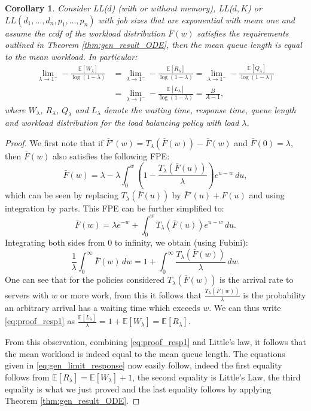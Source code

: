 \documentclass[12pt]{report}
\newcommand{\E}{\mathbb{E}}
\newtheorem{corollary}[theorem]{Corollary}
\begin{document}
\begin{corollary}\label{cor:gen_result}
Consider LL($d$) (with or without memory), LL($d,K$) or $LL(d_1,\ldots,d_n,p_1,\ldots,p_n)$ with
job sizes that are exponential with mean one and assume 
the ccdf of the workload distribution $\bar F(w)$ satisfies the requirements outlined in Theorem \ref{thm:gen_result_ODE}, then the mean queue length is equal to the mean workload. In particular:
\begin{align}
\lim_{\lambda\rightarrow 1^-} - \frac{\E[W_\lambda]}{\log(1-\lambda)} 
&= \lim_{\lambda\rightarrow 1^-} - \frac{\E[R_\lambda]}{\log(1-\lambda)} 
= \lim_{\lambda\rightarrow 1^-} - \frac{\E[Q_\lambda]}{\log(1-\lambda)} \nonumber\\
&= \lim_{\lambda\rightarrow 1^-} - \frac{\E[L_\lambda]}{\log(1-\lambda)}
= \frac{B}{A-1},\label{eq:gen_limit_response}
\end{align}
where $W_\lambda$, $R_\lambda$, $Q_\lambda$ and $L_\lambda$ denote the waiting time, response time, queue length and workload distribution for the load balancing policy with load $\lambda$.
\end{corollary}
\begin{proof}
We first note that if $\bar F'(w) = T_\lambda(\bar{F}(w)) - \bar F(w)$
and $\bar F(0) = \lambda$, then $\bar F(w)$ also satisfies the following FPE:
$$
\bar F(w) = \lambda - \lambda \int_0^w \left( 1 - \frac{T_\lambda(\bar F(u))}{\lambda} \right) e^{u-w} \, du,
$$
which can be seen by replacing $T_\lambda(\bar F(u))$ by $\bar F'(u)+F(u)$ and using integration
by parts. This FPE can be further simplified to:
$$
\bar F(w) = \lambda e^{-w} + \int_0^w T_\lambda(\bar F(u)) e^{u-w} \, du.
$$
Integrating both sides from $0$ to infinity, we obtain (using Fubini):
\begin{equation} \label{eq:proof_resp1}
\frac{1}{\lambda} \int_0^\infty \bar F(w) \, dw = 1 + \int_0^\infty \frac{T_\lambda(\bar F(w))}{\lambda} \, dw.
\end{equation}
One can see that for the policies considered $T_\lambda(\bar F(w))$ is the arrival rate to servers with $w$ or more work, from this it follows that $\frac{T_\lambda(\bar F(w))}{\lambda}$ is the probability an arbitrary arrival has a waiting time which exceeds $w$. We can thus write \eqref{eq:proof_resp1} as $\frac{\E[L_\lambda]}{\lambda} = 1 + \E[W_\lambda] = \E[R_\lambda]$.

From this observation, combining \eqref{eq:proof_resp1} and Little's law, it follows that the mean workload is indeed equal to the mean queue length. The equations given in \eqref{eq:gen_limit_response} now easily follow, indeed the first equality follows from $\E[R_\lambda] = \E[W_\lambda] + 1$, the second equality is Little's Law, the third equality is what we just proved and the last equality follows by applying Theorem \ref{thm:gen_result_ODE}.
\end{proof}
\end{document}
